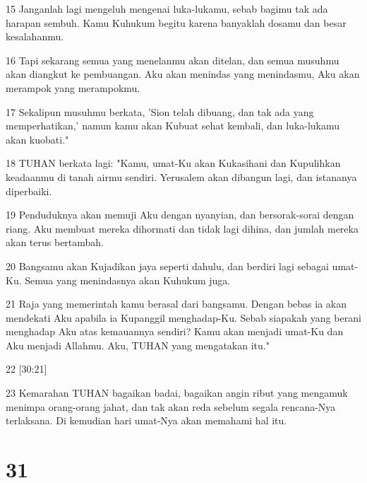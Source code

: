 \par 15 Janganlah lagi mengeluh mengenai luka-lukamu, sebab bagimu tak ada harapan sembuh. Kamu Kuhukum begitu karena banyaklah dosamu dan besar kesalahanmu.
\par 16 Tapi sekarang semua yang menelanmu akan ditelan, dan semua musuhmu akan diangkut ke pembuangan. Aku akan menindas yang menindasmu, Aku akan merampok yang merampokmu.
\par 17 Sekalipun musuhmu berkata, 'Sion telah dibuang, dan tak ada yang memperhatikan,' namun kamu akan Kubuat sehat kembali, dan luka-lukamu akan kuobati."
\par 18 TUHAN berkata lagi: "Kamu, umat-Ku akan Kukasihani dan Kupulihkan keadaanmu di tanah airmu sendiri. Yerusalem akan dibangun lagi, dan istananya diperbaiki.
\par 19 Penduduknya akan memuji Aku dengan nyanyian, dan bersorak-sorai dengan riang. Aku membuat mereka dihormati dan tidak lagi dihina, dan jumlah mereka akan terus bertambah.
\par 20 Bangsamu akan Kujadikan jaya seperti dahulu, dan berdiri lagi sebagai umat-Ku. Semua yang menindasnya akan Kuhukum juga.
\par 21 Raja yang memerintah kamu berasal dari bangsamu. Dengan bebas ia akan mendekati Aku apabila ia Kupanggil menghadap-Ku. Sebab siapakah yang berani menghadap Aku atas kemauannya sendiri? Kamu akan menjadi umat-Ku dan Aku menjadi Allahmu. Aku, TUHAN yang mengatakan itu."
\par 22 [30:21]
\par 23 Kemarahan TUHAN bagaikan badai, bagaikan angin ribut yang mengamuk menimpa orang-orang jahat, dan tak akan reda sebelum segala rencana-Nya terlaksana. Di kemudian hari umat-Nya akan memahami hal itu.

\chapter{31}

